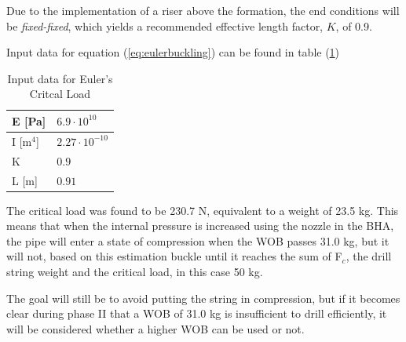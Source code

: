 Due to the implementation of a riser above the formation, the end conditions will be \textit{fixed-fixed}, which yields a recommended effective length factor, $K$, of 0.9.

Input data for equation (\ref{eq:eulerbuckling}) can be found in table (\ref{tab:inputdataeuler})


\begin{table} [H]
    \centering
    \caption{Input data for Euler's Critcal Load}
    \begin{tabular}{p{2cm} p{3cm}}
        E [Pa] & $6.9\cdot10^{10}$ \\ \hline
        I [m$^4$] & $2.27\cdot10^{-10}$ \\ \hline
        K & $0.9$ \\ \hline
        L [m] & $0.91$ \\ 
    \end{tabular}
    \label{tab:inputdataeuler}
\end{table}

The critical load was found to be 230.7 N, equivalent to a weight of 23.5 kg. This means that when the internal pressure is increased using the nozzle in the BHA, the pipe will enter a state of compression when the WOB passes 31.0 kg, but it will not, based on this estimation buckle until it reaches the sum of F$_c$, the drill string weight and the critical load, in this case 50 kg.

The goal will still be to avoid putting the string in compression, but if it becomes clear during phase II that a WOB of 31.0 kg is insufficient to drill efficiently, it will be considered whether a higher WOB can be used or not.